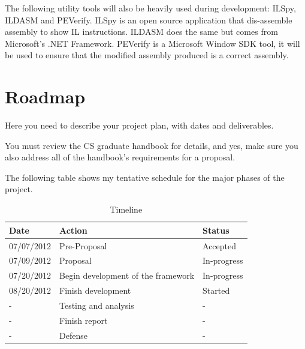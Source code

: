 The following utility tools will also be heavily used during development: ILSpy, ILDASM and PEVerify. ILSpy is an open source application that dis-assemble assembly to show IL instructions. ILDASM does the same but comes from Microsoft’s .NET Framework. PEVerify is a Microsoft Window SDK tool, it will be used to ensure that the modified assembly produced is a correct assembly.

\section{Roadmap}

Here you need to describe your project plan, with dates and deliverables. 

You must review the CS graduate handbook for details, and yes, make
sure you also address all of the handbook's requirements for a
proposal.

The following table shows my tentative schedule for the major phases of the project.

\begin{table}[h]
\centering
\begin{tabular}{|l|l|l|}
\hline
Date & Action & Status\\
\hline
07/07/2012 & Pre-Proposal & Accepted\\
07/09/2012 & Proposal & In-progress\\
07/20/2012 & Begin development of the framework & In-progress\\
08/20/2012 & Finish development & Started\\
- & Testing and analysis & - \\
- & Finish report & - \\
- & Defense & - \\
\hline
\end{tabular}
\caption{Timeline}
\label{tab:template}
\end{table}



\singlespacing





